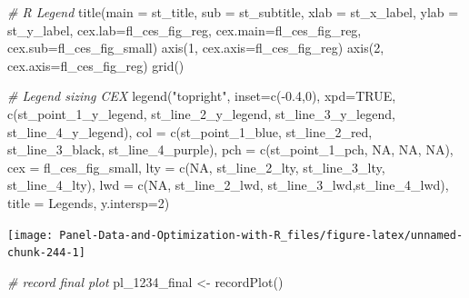 \documentclass[
]{book}
\newenvironment{Shaded}{\begin{snugshade}}{\end{snugshade}}
\newcommand{\AttributeTok}[1]{\textcolor[rgb]{0.77,0.63,0.00}{#1}}
\newcommand{\CommentTok}[1]{\textcolor[rgb]{0.56,0.35,0.01}{\textit{#1}}}
\newcommand{\ConstantTok}[1]{\textcolor[rgb]{0.00,0.00,0.00}{#1}}
\newcommand{\DecValTok}[1]{\textcolor[rgb]{0.00,0.00,0.81}{#1}}
\newcommand{\FloatTok}[1]{\textcolor[rgb]{0.00,0.00,0.81}{#1}}
\newcommand{\FunctionTok}[1]{\textcolor[rgb]{0.00,0.00,0.00}{#1}}
\newcommand{\NormalTok}[1]{#1}
\newcommand{\OtherTok}[1]{\textcolor[rgb]{0.56,0.35,0.01}{#1}}
\newcommand{\SpecialCharTok}[1]{\textcolor[rgb]{0.00,0.00,0.00}{#1}}
\newcommand{\StringTok}[1]{\textcolor[rgb]{0.31,0.60,0.02}{#1}}
\begin{document}
\begin{Shaded}
\begin{Highlighting}[]
\CommentTok{\# R Legend}
\FunctionTok{title}\NormalTok{(}\AttributeTok{main =}\NormalTok{ st\_title, }\AttributeTok{sub =}\NormalTok{ st\_subtitle, }\AttributeTok{xlab =}\NormalTok{ st\_x\_label, }\AttributeTok{ylab =}\NormalTok{ st\_y\_label,}
      \AttributeTok{cex.lab=}\NormalTok{fl\_ces\_fig\_reg,}
      \AttributeTok{cex.main=}\NormalTok{fl\_ces\_fig\_reg,}
      \AttributeTok{cex.sub=}\NormalTok{fl\_ces\_fig\_small)}
\FunctionTok{axis}\NormalTok{(}\DecValTok{1}\NormalTok{, }\AttributeTok{cex.axis=}\NormalTok{fl\_ces\_fig\_reg)}
\FunctionTok{axis}\NormalTok{(}\DecValTok{2}\NormalTok{, }\AttributeTok{cex.axis=}\NormalTok{fl\_ces\_fig\_reg)}
\FunctionTok{grid}\NormalTok{()}

\CommentTok{\# Legend sizing CEX}
\FunctionTok{legend}\NormalTok{(}\StringTok{"topright"}\NormalTok{,}
       \AttributeTok{inset=}\FunctionTok{c}\NormalTok{(}\SpecialCharTok{{-}}\FloatTok{0.4}\NormalTok{,}\DecValTok{0}\NormalTok{),}
       \AttributeTok{xpd=}\ConstantTok{TRUE}\NormalTok{,}
       \FunctionTok{c}\NormalTok{(st\_point\_1\_y\_legend, st\_line\_2\_y\_legend, st\_line\_3\_y\_legend, st\_line\_4\_y\_legend),}
       \AttributeTok{col =} \FunctionTok{c}\NormalTok{(st\_point\_1\_blue, st\_line\_2\_red, st\_line\_3\_black, st\_line\_4\_purple),}
       \AttributeTok{pch =} \FunctionTok{c}\NormalTok{(st\_point\_1\_pch, }\ConstantTok{NA}\NormalTok{, }\ConstantTok{NA}\NormalTok{, }\ConstantTok{NA}\NormalTok{),}
       \AttributeTok{cex =}\NormalTok{ fl\_ces\_fig\_small,}
       \AttributeTok{lty =} \FunctionTok{c}\NormalTok{(}\ConstantTok{NA}\NormalTok{, st\_line\_2\_lty, st\_line\_3\_lty, st\_line\_4\_lty),}
       \AttributeTok{lwd =} \FunctionTok{c}\NormalTok{(}\ConstantTok{NA}\NormalTok{, st\_line\_2\_lwd, st\_line\_3\_lwd,st\_line\_4\_lwd),}
       \AttributeTok{title =} \StringTok{\textquotesingle{}Legends\textquotesingle{}}\NormalTok{,}
       \AttributeTok{y.intersp=}\DecValTok{2}\NormalTok{)}
\end{Highlighting}
\end{Shaded}

\begin{center}\texttt{[image: Panel-Data-and-Optimization-with-R\_files/figure-latex/unnamed-chunk-244-1]} \end{center}

\begin{Shaded}
\begin{Highlighting}[]
\CommentTok{\# record final plot}
\NormalTok{pl\_1234\_final }\OtherTok{\textless{}{-}} \FunctionTok{recordPlot}\NormalTok{()}
\end{Highlighting}
\end{Shaded}
\end{document}

